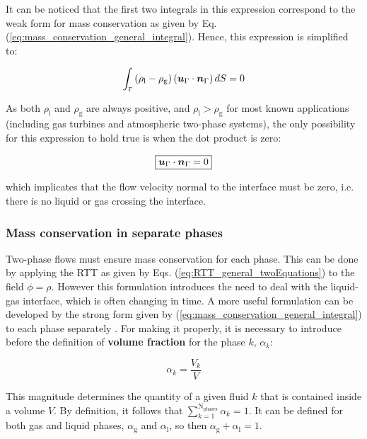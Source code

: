 It can be noticed that the first two integrals in this expression correspond to the weak form for mass conservation as given by Eq. (\ref{eq:mass_conservation_general_integral}). Hence, this expression is simplified to:

\begin{equation}
\int_\mathsmaller{\Gamma} \left( \rho_\mathrm{l} - \rho_\mathrm{g} \right) \left( \boldsymbol{u}_{\scriptsize{\Gamma}} \cdot \boldsymbol{n}_{\scriptsize{\Gamma}} \right) dS = 0
\end{equation}

As both $\rho_\mathrm{l}$ and $\rho_\mathrm{g}$ are always positive, and $\rho_\mathrm{l} > \rho_\mathrm{g}$ for most known applications (including gas turbines and atmospheric two-phase systems), the only possibility for this expression to hold true is when the dot product is zero:

\begin{equation}
\label{eq:continuity_TPF_noFluxThroughInterface}
\boxed{
\boldsymbol{u}_{\scriptsize{\Gamma}} \cdot \boldsymbol{n}_{\scriptsize{\Gamma}} = 0
}
\end{equation}

which implicates that the flow velocity normal to the interface must be zero, i.e. there is no liquid or gas crossing the interface. 

\subsubsection*{Mass conservation in separate phases}
	\label{eq:mass_conservation_separated_phases}

Two-phase flows must ensure mass conservation for each phase. This can be done by applying the RTT as given by Eqs. (\ref{eq:RTT_general_twoEquations}) to the field $\phi = \rho$. However this formulation introduces the need to deal with the liquid-gas interface, which is often changing in time. A more useful formulation can be developed by the strong form given by (\ref{eq:mass_conservation_general_integral}) to each phase separately . For making it properly, it is necessary to introduce before the definition of \textbf{volume fraction} for the phase $k$, $\alpha_k$:

\begin{equation}
\label{eq:vol_frac_definition}
\alpha_k = \frac{V_k}{V}
\end{equation}

This magnitude determines the quantity of a given fluid $k$ that is contained inside a volume $V$. By definition, it follows that $\sum_{k=1}^\mathrm{N_{phases}} \alpha_k = 1$. It can be defined for both gas and liquid phases, $\alpha_\mathrm{g}$ and $\alpha_\mathrm{l}$, so then $\alpha_\mathrm{g} + \alpha_\mathrm{l} = 1$.

